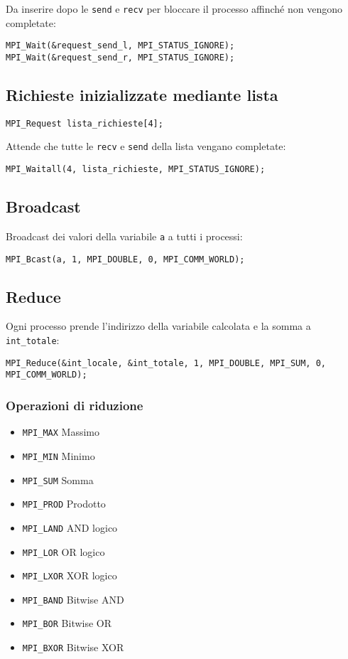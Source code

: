 \documentclass{article}
\begin{document}
Da inserire dopo le \texttt{send} e \texttt{recv} per bloccare il processo affinché non vengono completate:
\begin{verbatim}
MPI_Wait(&request_send_l, MPI_STATUS_IGNORE);
MPI_Wait(&request_send_r, MPI_STATUS_IGNORE);
\end{verbatim}

\subsection{Richieste inizializzate mediante lista}
\begin{verbatim}
MPI_Request lista_richieste[4];
\end{verbatim}

Attende che tutte le \texttt{recv} e \texttt{send} della lista vengano completate:
\begin{verbatim}
MPI_Waitall(4, lista_richieste, MPI_STATUS_IGNORE);
\end{verbatim}

\subsection{Broadcast}
Broadcast dei valori della variabile \texttt{a} a tutti i processi:
\begin{verbatim}
MPI_Bcast(a, 1, MPI_DOUBLE, 0, MPI_COMM_WORLD);
\end{verbatim}

\subsection{Reduce}
Ogni processo prende l'indirizzo della variabile calcolata e la somma a \texttt{int\_totale}:
\begin{verbatim}
MPI_Reduce(&int_locale, &int_totale, 1, MPI_DOUBLE, MPI_SUM, 0, MPI_COMM_WORLD);
\end{verbatim}

\subsubsection{Operazioni di riduzione}
\begin{itemize}
    \item \texttt{MPI\_MAX} Massimo
    \item \texttt{MPI\_MIN} Minimo
    \item \texttt{MPI\_SUM} Somma
    \item \texttt{MPI\_PROD} Prodotto
    \item \texttt{MPI\_LAND} AND logico
    \item \texttt{MPI\_LOR} OR logico
    \item \texttt{MPI\_LXOR} XOR logico
    \item \texttt{MPI\_BAND} Bitwise AND
    \item \texttt{MPI\_BOR} Bitwise OR
    \item \texttt{MPI\_BXOR} Bitwise XOR
\end{itemize}
\end{document}
